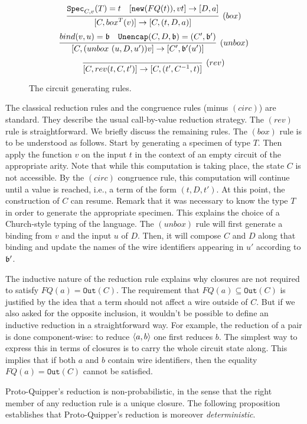 \documentclass{article}
\begin{document}
\begin{figure}[!ht]
\begin{mdframed}
\[
  \infer[(box)]{[C,box^T(v)]\to [C,(t,D,a)]}{
    \spec_{C,v}(T)=t
    &
    [\mathtt{new}(FQ(t)), vt] \to [D,a]
  }
\]
\[
  \infer[(unbox)]{[C,(unbox~(u,D,u'))v]\to [C',\binding'(u')]}{
    bind(v,u)=\binding 
    &
    \mathtt{Unencap}(C,D,\binding) = (C',\binding') 
  }
\]
\[
  \infer[(rev)]{[C,rev (t,C,t')]\to [C,(t',C^{-1},t)]}{}
\]
\end{mdframed}
\caption{The circuit generating rules.}
\label{circ_gen_rules}
\end{figure}

The classical reduction rules and the congruence rules (minus $(circ)$) 
are standard. They describe the usual call-by-value reduction strategy. 
The $(rev)$ rule is straightforward. We briefly discuss the remaining 
rules. The $(box)$ rule is to be understood as follows. Start by 
generating a specimen of type $T$. Then apply the function $v$ on the 
input $t$ in the context of an empty circuit of the appropriate arity. 
Note that while this computation is taking place, the state $C$ is not 
accessible. By the $(circ)$ congruence rule, this computation will 
continue until a value is reached, i.e., a term of the form $(t,D,t')$. 
At this point, the construction of $C$ can resume. Remark that it was 
necessary to know the type $T$ in order to generate the appropriate 
specimen. This explains the choice of a Church-style typing of the 
language. The $(unbox)$ rule will first generate a binding from $v$ 
and the input $u$ of $D$. Then, it will compose $C$ and $D$ along that 
binding and update the names of the wire identifiers appearing in $u'$ 
according to $\mathfrak{b}'$.

The inductive nature of the reduction rule explains why closures are 
not required to satisfy $FQ(a)=\mathtt{Out}(C)$. The requirement that 
$FQ(a)\subseteq \mathtt{Out}(C)$ is justified by the idea that a term 
should not affect a wire outside of $C$. But if we also asked for the 
opposite inclusion, it wouldn't be possible to define an inductive 
reduction in a straightforward way. For example, the reduction of a 
pair is done component-wise: to reduce $\langle a,b\rangle$ one first reduces $b$. 
The simplest way to express this in terms of closures is to carry the 
whole circuit state along. This implies that if both $a$ and $b$ 
contain wire identifiers, then the equality $FQ(a)=\mathtt{Out}(C)$ 
cannot be satisfied.

Proto-Quipper's reduction is non-probabilistic, in the sense that the 
right member of any reduction rule is a unique closure. The following 
proposition establishes that Proto-Quipper's reduction is moreover  
\emph{deterministic}.
\end{document}
